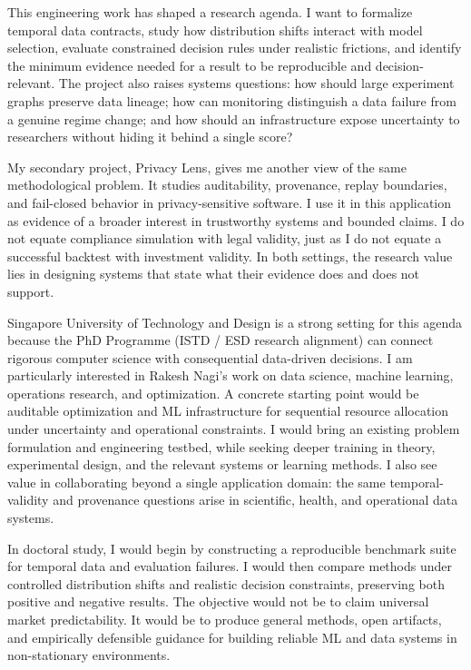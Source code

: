 \documentclass[11pt]{article}
\begin{document}
This engineering work has shaped a research agenda. I want to formalize temporal data contracts, study how distribution shifts interact with model selection, evaluate constrained decision rules under realistic frictions, and identify the minimum evidence needed for a result to be reproducible and decision-relevant. The project also raises systems questions: how should large experiment graphs preserve data lineage; how can monitoring distinguish a data failure from a genuine regime change; and how should an infrastructure expose uncertainty to researchers without hiding it behind a single score?

My secondary project, Privacy Lens, gives me another view of the same methodological problem. It studies auditability, provenance, replay boundaries, and fail-closed behavior in privacy-sensitive software. I use it in this application as evidence of a broader interest in trustworthy systems and bounded claims. I do not equate compliance simulation with legal validity, just as I do not equate a successful backtest with investment validity. In both settings, the research value lies in designing systems that state what their evidence does and does not support.

Singapore University of Technology and Design is a strong setting for this agenda because the PhD Programme (ISTD / ESD research alignment) can connect rigorous computer science with consequential data-driven decisions. I am particularly interested in Rakesh Nagi's work on data science, machine learning, operations research, and optimization. A concrete starting point would be auditable optimization and ML infrastructure for sequential resource allocation under uncertainty and operational constraints. I would bring an existing problem formulation and engineering testbed, while seeking deeper training in theory, experimental design, and the relevant systems or learning methods. I also see value in collaborating beyond a single application domain: the same temporal-validity and provenance questions arise in scientific, health, and operational data systems.

In doctoral study, I would begin by constructing a reproducible benchmark suite for temporal data and evaluation failures. I would then compare methods under controlled distribution shifts and realistic decision constraints, preserving both positive and negative results. The objective would not be to claim universal market predictability. It would be to produce general methods, open artifacts, and empirically defensible guidance for building reliable ML and data systems in non-stationary environments.
\end{document}
